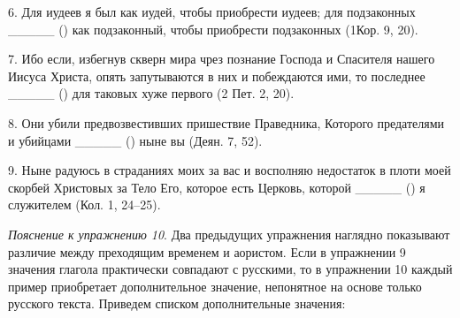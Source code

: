 \documentclass[11pt,a4paper,oneside]{memoir}
\begin{document}
    6. Для иудеев я был как иудей, чтобы приобрести иудеев; для подзаконных _____ ({}) как подзаконный, чтобы приобрести подзаконных (1Кор. 9, 20).

    7. Ибо если, избегнув скверн мира чрез познание Господа и Спасителя нашего Иисуса Христа, опять запутываются в них и побеждаются ими, то последнее _____ ({}) для таковых хуже первого (2 Пет. 2, 20).

    8. Они убили предвозвестивших пришествие Праведника, Которого предателями и убийцами _____ ({}) ныне вы (Деян. 7, 52).

    9. Ныне радуюсь в страданиях моих за вас и восполняю недостаток в плоти моей скорбей Христовых за Тело Его, которое есть Церковь, которой _____ ({}) я служителем (Кол. 1, 24--25).

    \emph{Пояснение к упражнению 10}. Два предыдущих упражнения наглядно показывают различие между преходящим временем и аористом. Если в упражнении 9 значения глагола {} практически совпадают с русскими, то в упражнении 10 каждый пример приобретает дополнительное значение, непонятное на основе только русского текста. Приведем списком дополнительные значения:
    
\end{document}
